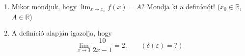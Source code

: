 \documentclass[11pt]{scrartcl}
\begin{document}
\begin{enumerate}
	\item Mikor mondjuk, hogy $\lim_{x \to x_0} f(x) = A$? Mondja ki a
	      definíciót! ($x_0 \in \mathbb{R}$, $A \in \mathbb{R}$)

	\item A definíció alapján igazolja, hogy
	      \[
		      \lim_{x \to 3} \frac{10}{2x - 1} = 2. \qquad (\delta(\varepsilon) = ?)
	      \]
\end{enumerate}
\end{document}
